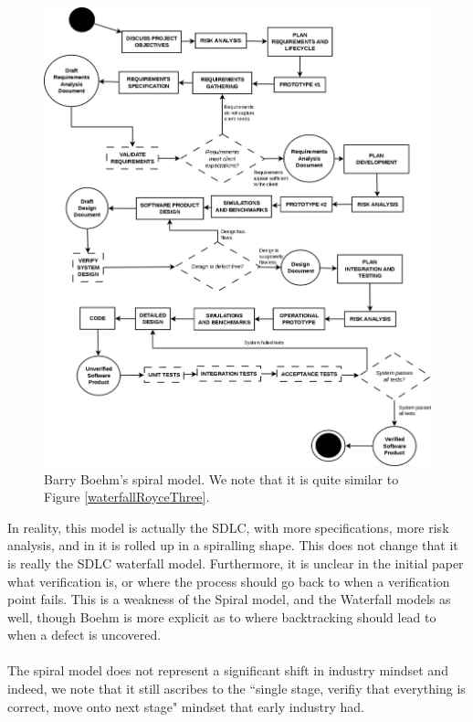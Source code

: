 \begin{figure}
	\centering
	\includegraphics[scale=0.3]{media/Spiral}
	\caption{Barry Boehm's spiral model. We note that it is quite similar to Figure
		\ref{waterfallRoyceThree}.}
	\label{Spiral}
\end{figure}

In reality, this model is actually the SDLC, with more specifications, more risk analysis, and
in \cite{Boehm:1986:SMS:12944.12948} it is rolled up in a spiralling shape.
This does not change that it is really the SDLC waterfall model.
Furthermore, it is unclear in the initial paper what verification is, or where the process should go
back to when a verification point fails.
This is a weakness of the Spiral model, and the Waterfall models as well, though Boehm is more
explicit as to where backtracking should lead to when a defect is uncovered.\\
\\
The spiral model does not represent a significant shift in industry mindset and indeed, we note that
it still ascribes to the ``single stage, verifiy that everything is correct, move onto next stage"
mindset that early industry had.

